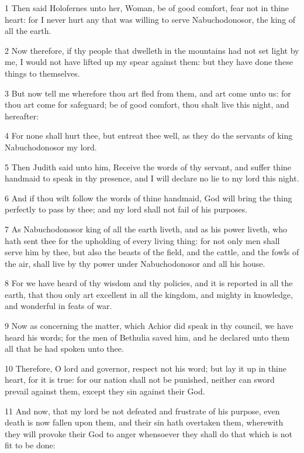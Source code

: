 \par 1 Then said Holofernes unto her, Woman, be of good comfort, fear not in thine heart: for I never hurt any that was willing to serve Nabuchodonosor, the king of all the earth.
\par 2 Now therefore, if thy people that dwelleth in the mountains had not set light by me, I would not have lifted up my spear against them: but they have done these things to themselves.
\par 3 But now tell me wherefore thou art fled from them, and art come unto us: for thou art come for safeguard; be of good comfort, thou shalt live this night, and hereafter:
\par 4 For none shall hurt thee, but entreat thee well, as they do the servants of king Nabuchodonosor my lord.
\par 5 Then Judith said unto him, Receive the words of thy servant, and suffer thine handmaid to speak in thy presence, and I will declare no lie to my lord this night.
\par 6 And if thou wilt follow the words of thine handmaid, God will bring the thing perfectly to pass by thee; and my lord shall not fail of his purposes.
\par 7 As Nabuchodonosor king of all the earth liveth, and as his power liveth, who hath sent thee for the upholding of every living thing: for not only men shall serve him by thee, but also the beasts of the field, and the cattle, and the fowls of the air, shall live by thy power under Nabuchodonosor and all his house.
\par 8 For we have heard of thy wisdom and thy policies, and it is reported in all the earth, that thou only art excellent in all the kingdom, and mighty in knowledge, and wonderful in feats of war.
\par 9 Now as concerning the matter, which Achior did speak in thy council, we have heard his words; for the men of Bethulia saved him, and he declared unto them all that he had spoken unto thee.
\par 10 Therefore, O lord and governor, respect not his word; but lay it up in thine heart, for it is true: for our nation shall not be punished, neither can sword prevail against them, except they sin against their God.
\par 11 And now, that my lord be not defeated and frustrate of his purpose, even death is now fallen upon them, and their sin hath overtaken them, wherewith they will provoke their God to anger whensoever they shall do that which is not fit to be done:
